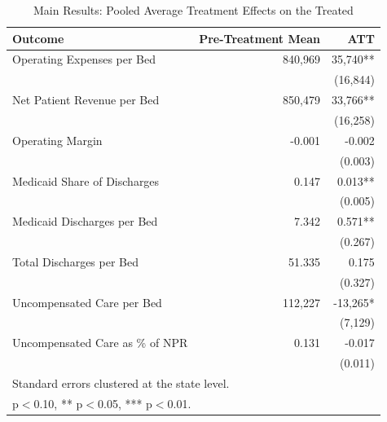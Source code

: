 \begin{table}[!h]
\centering
\caption{Main Results: Pooled Average Treatment Effects on the Treated}
\centering
\begin{tabular}[t]{lrr}
\toprule
Outcome & Pre-Treatment Mean & ATT\\
\midrule
Operating Expenses per Bed & 840,969 & 35,740**\\
 &  & (16,844)\\
Net Patient Revenue per Bed & 850,479 & 33,766**\\
 &  & (16,258)\\
Operating Margin & -0.001 & -0.002\\
\addlinespace
 &  & (0.003)\\
Medicaid Share of Discharges & 0.147 & 0.013**\\
 &  & (0.005)\\
Medicaid Discharges per Bed & 7.342 & 0.571**\\
 &  & (0.267)\\
\addlinespace
Total Discharges per Bed & 51.335 & 0.175\\
 &  & (0.327)\\
Uncompensated Care per Bed & 112,227 & -13,265*\\
 &  & (7,129)\\
Uncompensated Care as \% of NPR & 0.131 & -0.017\\
\addlinespace
 &  & (0.011)\\
\bottomrule

\multicolumn{3}{l}{\footnotesize Standard errors clustered at the state level.}\\
\multicolumn{3}{l}{\footnotesize * p$<$0.10, ** p$<$0.05, *** p$<$0.01.}\\
\end{tabular}
\end{table}

